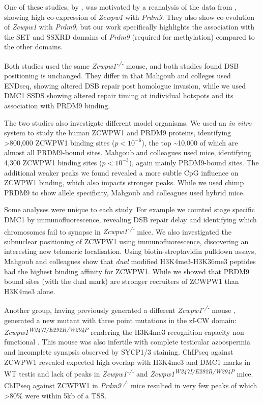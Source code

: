 One of these studies, by \cite{Mahgoub2019Dual}, was motivated by a reanalysis of the data from \cite{Chen2018Singlecell}, showing high co-expression of \textit{Zcwpw1} with \textit{Prdm9}.
They also show co-evolution of \textit{Zcwpw1} with \textit{Prdm9}, but our work specifically highlights the association with the SET and SSXRD domains of \textit{Prdm9} (required for methylation) compared to the other domains.

Both studies used the same \textit{Zcwpw1\textsuperscript{-/-}} mouse, and both studies found DSB positioning is unchanged.
They differ in that Mahgoub and colleges used ENDseq, showing altered DSB repair post homologue invasion, while we used DMC1 SSDS showing altered repair timing at individual hotspots and its association with PRDM9 binding.

The two studies also investigate different model organisms.
We used an \textit{in vitro} system to study the human ZCWPW1 and PRDM9 proteins, identifying >800,000 ZCWPW1 binding sites ($p<10^{-6}$), the top \textasciitilde10,000 of which are almost all PRDM9-bound sites.
Mahgoub and colleagues used mice, identifying 4,300 ZCWPW1 binding sites ($p<10^{-3}$), again mainly PRDM9-bound sites.
The additional weaker peaks we found revealed a more subtle CpG influence on ZCWPW1 binding, which also impacts stronger peaks.
While we used chimp PRDM9 to show allele specificity, Mahgoub and colleagues used hybrid mice.

Some analyses were unique to each study.
For example we counted stage specific DMC1 by immunofluorescence, revealing DSB repair delay and identifying which chromosomes fail to synapse in \textit{Zcwpw1\textsuperscript{-/-}} mice.
We also investigated the subnuclear positioning of ZCWPW1 using immunofluorescence, discovering an interesting new telomeric localisation.
Using biotin-streptavidin pulldown assays, Mahgoub and colleagues show that \emph{dual} modified H3K4me3-H3K36me3 peptides had the highest binding affinity for ZCWPW1.
While we showed that PRDM9 bound sites (with the dual mark) are stronger recruiters of ZCWPW1 than H3K4me3 alone.

Another group, having previously generated a different \textit{Zcwpw1\textsuperscript{-/-}} mouse \parencite{Li2019histone}, generated a new mutant with three point mutations in the zf-CW domain: \textit{Zcwpw1\textsuperscript{W247I/E292R/W294P}} rendering the H3K4me3 recognition capacity non-functional \parencite{Huang2019histone}.
This mouse was also infertile with complete testicular azoospermia and incomplete synapsis observed by SYCP1/3 staining.
ChIPseq against ZCWPW1 revealed expected high overlap with H3K4me3 and DMC1 marks in WT testis and lack of peaks in \textit{Zcwpw1\textsuperscript{-/-}} and \textit{Zcwpw1\textsuperscript{W247I/E292R/W294P}} mice.
ChIPseq against ZCWPW1 in \textit{Prdm9\textsuperscript{-/-}} mice resulted in very few peaks of which >80\% were within 5kb of a TSS.

